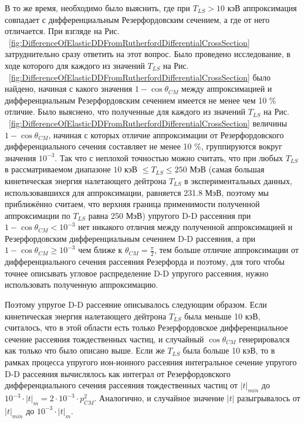 \documentclass[a4paper,12pt]{article}
\begin{document}
\begin{large}
	В то же время, необходимо было выяснить, где при $T_{LS}>10$ кэВ аппроксимация совпадает с дифференциальным Резерфордовским сечением, а где от него отличается. 
	При взгляде на Рис. ~\ref{fig:DifferenceOfElasticDDFromRutherfordDifferentialCrossSection} затруднительно сразу ответить на этот вопрос. 
	Было проведено исследование, в ходе которого для каждого из значений $T_{LS}$ на Рис. ~\ref{fig:DifferenceOfElasticDDFromRutherfordDifferentialCrossSection} было найдено, начиная с какого значения $1-\cos{ \theta_{CM} }$ между аппроксимацией и дифференциальным Резерфордовским сечением имеется не менее чем 10 \% отличие. 
	Было выяснено, что полученные для каждого из значений $T_{LS}$ на Рис. ~\ref{fig:DifferenceOfElasticDDFromRutherfordDifferentialCrossSection} величины $1-\cos{ \theta_{CM} }$, начиная с которых отличие аппроксимации от Резерфордовского дифференциального сечения составляет не менее 10 \%, группируются вокруг значения $10^{-3}$. 
	Так что с неплохой точностью можно считать, что при любых $T_{LS}$ в рассматриваемом диапазоне $10$ кэВ $\leq T_{LS} \leq 250$ МэВ (самая большая кинетическая энергия налетающего дейтрона $T_{LS}$ в экспериментальных данных, использовавшихся  для аппроксимации, равняется 231.8 МэВ, поэтому мы приближённо считаем, что верхняя граница применимости полученной аппроксимации по $T_{LS}$ равна 250 МэВ) упругого D-D рассеяния при $1-\cos{ \theta_{CM}} < 10^{-3}$ нет никакого отличия между полученной аппроксимацией и Резерфордовским дифференциальным сечением D-D рассеяния, а при $1-\cos{ \theta_{CM}} \geq 10^{-3}$ чем ближе к $\theta_{CM}=\frac{\pi}{2}$, тем больше отличие аппроксимации от дифференциального сечения рассеяния Резерфорда и поэтому, для того чтобы точнее описывать угловое распределение D-D упругого рассеяния, нужно использовать полученную аппроксимацию.
	
	Поэтому упругое D-D рассеяние описывалось следующим образом.
	Если кинетическая энергия налетающего дейтрона $T_{LS}$ была меньше 10 кэВ, считалось, что в этой области есть только Резерфордовское дифференциальное сечение рассеяния тождественных частиц, и случайный $\cos{\theta_{CM}}$ генерировался как только что было описано выше.
	Если же $T_{LS}$ была больше 10 кэВ, то в рамках процесса упругого ион-ионного рассеяния интегральное сечение упругого D-D рассеяния вычислялось как интеграл от Резерфордовского дифференциального сечения рассеяния тождественных частиц от $|t|_{min}$ до $10^{-3}\cdot |t|_{m}=2\cdot 10^{-3}\cdot p^2_{CM}$.
	Аналогично, и случайное значение $|t|$ разыгрывалось от $|t|_{min}$ до $10^{-3}\cdot |t|_m$.
	

\end{large}
\end{document}
